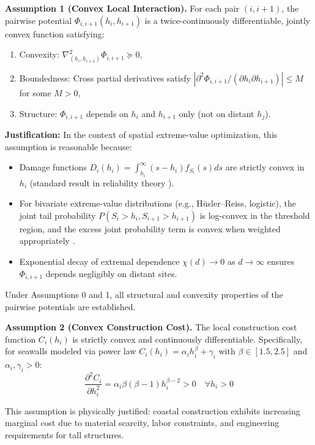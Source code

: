 \documentclass[12pt]{article}
\theoremstyle{definition}
\begin{document}
\begin{boxed}
\textbf{Assumption 1 (Convex Local Interaction).}
For each pair $(i, i+1)$, the pairwise potential $\Phi_{i,i+1}(h_i, h_{i+1})$ is a twice-continuously differentiable, jointly convex function satisfying:
\begin{enumerate}
    \item Convexity: $\nabla_{(h_i,h_{i+1})}^2 \Phi_{i,i+1} \succeq 0$,
    \item Boundedness: Cross partial derivatives satisfy $|\partial^2\Phi_{i,i+1}/(\partial h_i \partial h_{i+1})| \leq M$ for some $M>0$,
    \item Structure: $\Phi_{i,i+1}$ depends on $h_i$ and $h_{i+1}$ only (not on distant $h_j$).
\end{enumerate}

\noindent\textbf{Justification:} In the context of spatial extreme-value optimization, this assumption is reasonable because:
\begin{itemize}
    \item Damage functions $D_i(h_i) = \int_{h_i}^\infty (s-h_i) f_{S_i}(s)ds$ are strictly convex in $h_i$ (standard result in reliability theory \cite{Rockafellar:ConvexAnalysis}).
    \item For bivariate extreme-value distributions (e.g., Hüsler--Reiss, logistic), the joint tail probability $P(S_i > h_i, S_{i+1} > h_{i+1})$ is log-convex in the threshold region, and the excess joint probability term is convex when weighted appropriately \cite{Coles:ExtremeStats, Sorensen:Reliability}.
    \item Exponential decay of extremal dependence $\chi(d) \to 0$ as $d\to\infty$ ensures $\Phi_{i,i+1}$ depends negligibly on distant sites.
\end{itemize}

\noindent Under Assumptions 0 and 1, all structural and convexity properties of the pairwise potentials are established.
\end{boxed}

\begin{boxed}
\textbf{Assumption 2 (Convex Construction Cost).}
The local construction cost function $C_i(h_i)$ is strictly convex and continuously differentiable. Specifically, for seawalls modeled via power law $C_i(h_i) = \alpha_i h_i^\beta + \gamma_i$ with $\beta \in [1.5, 2.5]$ and $\alpha_i, \gamma_i > 0$:
\[
\frac{\partial^2 C_i}{\partial h_i^2} = \alpha_i \beta(\beta-1) h_i^{\beta-2} > 0 \quad \forall h_i > 0
\]

This assumption is physically justified: coastal construction exhibits increasing marginal cost due to material scarcity, labor constraints, and engineering requirements for tall structures.
\end{boxed}
\end{document}
